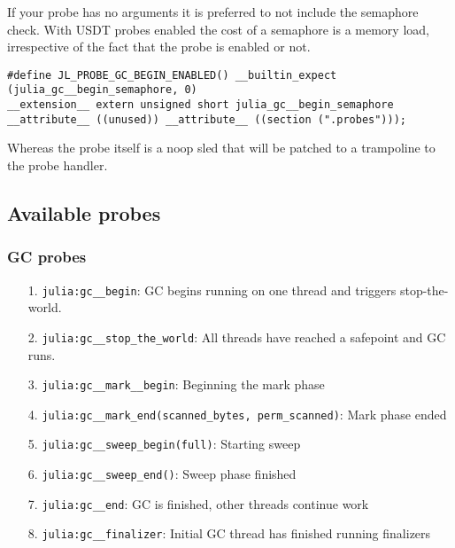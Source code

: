 If your probe has no arguments it is preferred to not include the semaphore check. With USDT probes enabled the cost of a semaphore is a memory load, irrespective of the fact that the probe is enabled or not.




\begin{lstlisting}
#define JL_PROBE_GC_BEGIN_ENABLED() __builtin_expect (julia_gc__begin_semaphore, 0)
__extension__ extern unsigned short julia_gc__begin_semaphore __attribute__ ((unused)) __attribute__ ((section (".probes")));
\end{lstlisting}



Whereas the probe itself is a noop sled that will be patched to a trampoline to the probe handler.



\hypertarget{5986924530124409558}{}


\subsection{Available probes}



\hypertarget{15347650561970213123}{}


\subsubsection{GC probes}



\begin{itemize}
\item[1. ] \texttt{julia:gc\_\_begin}: GC begins running on one thread and triggers stop-the-world.


\item[2. ] \texttt{julia:gc\_\_stop\_the\_world}: All threads have reached a safepoint and GC runs.


\item[3. ] \texttt{julia:gc\_\_mark\_\_begin}: Beginning the mark phase


\item[4. ] \texttt{julia:gc\_\_mark\_end(scanned\_bytes, perm\_scanned)}: Mark phase ended


\item[5. ] \texttt{julia:gc\_\_sweep\_begin(full)}: Starting sweep


\item[6. ] \texttt{julia:gc\_\_sweep\_end()}: Sweep phase finished


\item[7. ] \texttt{julia:gc\_\_end}: GC is finished, other threads continue work


\item[8. ] \texttt{julia:gc\_\_finalizer}: Initial GC thread has finished running finalizers

\end{itemize}


